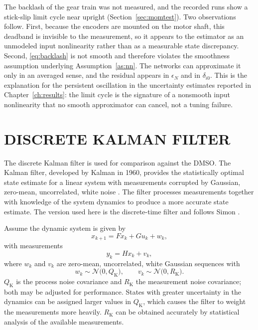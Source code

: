 \begin{remark}
\label{rem:backlash}
The backlash of the gear train was not measured, and the recorded runs show a
stick-slip limit cycle near upright (Section~\ref{sec:momtest}). Two
observations follow. First, because the encoders are mounted on the motor shaft,
this deadband is invisible to the measurement, so it appears to the estimator as
an unmodeled input nonlinearity rather than as a measurable state discrepancy.
Second, \eqref{eq:backlash} is not smooth and therefore violates the smoothness
assumption underlying Assumption~\ref{as:nn}. The networks can approximate it
only in an averaged sense, and the residual appears in $\epsilon_N$ and in
$\delta_{i0}$. This is the explanation for the persistent oscillation in the
uncertainty estimates reported in Chapter~\ref{ch:results}: the limit cycle is
the signature of a nonsmooth input nonlinearity that no smooth approximator can
cancel, not a tuning failure.
\end{remark}

\section{DISCRETE KALMAN FILTER}
\label{sec:dkf}

The discrete Kalman filter is used for comparison against the DMSO. The Kalman
filter, developed by Kalman in 1960, provides the statistically optimal state
estimate for a linear system with measurements corrupted by Gaussian,
zero-mean, uncorrelated, white noise \cite{kalman1960}. The filter processes
measurements together with knowledge of the system dynamics to produce a more
accurate state estimate. The version used here is the discrete-time filter and
follows Simon \cite{simon2006optimal}.

Assume the dynamic system is given by
\begin{equation}\label{eq:kfplant}
x_{k+1}=Fx_k+Gu_k+w_k ,
\end{equation}
with measurements
\begin{equation}\label{eq:kfmeas}
y_k=Hx_k+v_k ,
\end{equation}
where $w_k$ and $v_k$ are zero-mean, uncorrelated, white Gaussian sequences with
\begin{equation}\label{eq:kfstats}
w_k\sim\mathcal{N}\bigl(0,Q_{\mathrm{K}}\bigr),
\qquad
v_k\sim\mathcal{N}\bigl(0,R_{\mathrm{K}}\bigr).
\end{equation}
$Q_{\mathrm{K}}$ is the process noise covariance and $R_{\mathrm{K}}$ the
measurement noise covariance; both may be adjusted for performance. States with
greater uncertainty in the dynamics can be assigned larger values in
$Q_{\mathrm{K}}$, which causes the filter to weight the measurements more
heavily. $R_{\mathrm{K}}$ can be obtained accurately by statistical analysis of
the available measurements.

